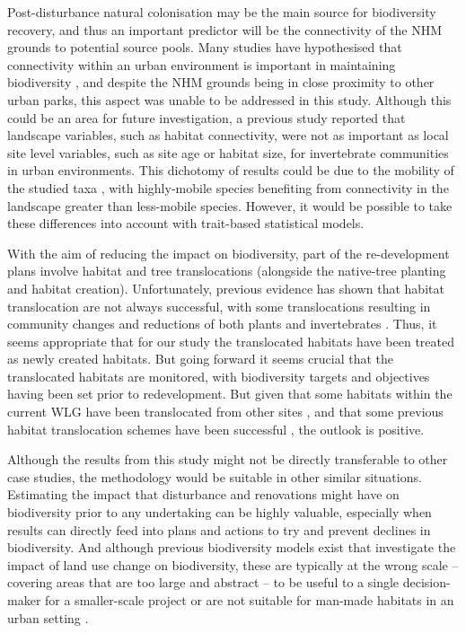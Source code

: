 Post-disturbance natural colonisation may be the main source for biodiversity recovery, and thus an important predictor will be the connectivity of the NHM grounds to potential source pools.  Many studies have hypothesised that connectivity within an urban environment is important in maintaining biodiversity \citep{Ockinger:2009lup; Goddard:2010tree; Kong:2010lup; Vergnes:2012bc}, and despite the NHM grounds being in close proximity to other urban parks, this aspect was unable to be addressed in this study. Although this could be an area for future investigation, a previous study \citep{Angold:2006ste} reported that landscape variables, such as habitat connectivity, were not as important as local site level variables, such as site age or habitat size, for invertebrate communities in urban environments. This dichotomy of results could be due to the mobility of the studied taxa \citep{Braaker:2014ec}, with highly-mobile species benefiting from connectivity in the landscape greater than less-mobile species.  However, it would be possible to take these differences into account with trait-based statistical models.

With the aim of reducing the impact on biodiversity, part of the re-development plans involve habitat and tree translocations (alongside the native-tree planting and habitat creation).  Unfortunately, previous evidence has shown that habitat translocation are not always successful, with some translocations resulting in community changes and reductions of both plants and invertebrates \citep{Bullock:1998bc; jncc:2003ht}. Thus, it seems appropriate that for our study the translocated habitats have been treated as newly created habitats.  But going forward it seems crucial that the translocated habitats are monitored, with biodiversity targets and objectives having been set prior to redevelopment. But given that some habitats within the current WLG have been translocated from other sites \citep{Honey:1999ln; Leigh:2003ln}, and that some previous habitat translocation schemes have been successful \citep{dunford:2010; Twyford:2012}, the outlook is positive.

Although the results from this study might not be directly transferable to other case studies, the methodology would be suitable in other similar situations. Estimating the impact that disturbance and renovations might have on biodiversity prior to any undertaking can be highly valuable, especially when results can directly feed into plans and actions to try and prevent declines in biodiversity. And although previous biodiversity models exist that investigate the impact of land use change on biodiversity, these are typically at the wrong scale -- covering areas that are too large and abstract -- to be useful to a single decision-maker for a smaller-scale project \citep[e.g.][]{Newbold:2015nat} or are not suitable for man-made habitats in an urban setting \citep[e.g.][]{defra:2012bdo}.


